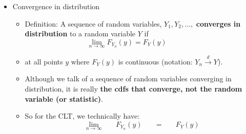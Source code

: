 \documentclass{article}
\begin{document}
\begin{itemize}
\begin{enumerate}
    \end{enumerate}\bigskip
    \item Convergence in distribution
    \begin{itemize}
        \item Definition: A sequence of random variables, $Y_1, Y_2, \dots,$ \textbf{converges in distribution} to a random variable $Y$ if
        \[\lim_{n \to \infty} F_{Y_n}(y) = F_Y(y)\hspace{50pt}\]
        \item[] at all points $y$ where $F_Y(y)$ is continuous (notation: $Y_n \overset{d}{\to} Y$).\bigskip
        \item Although we talk of a sequence of random variables converging in distribution, it is really \textbf{the cdfs that converge, not the random variable (or statistic)}.
        \item[] So for the CLT, we technically have:
        \[\lim_{n \to \infty} \hspace{20pt} F_{Y_n}(y) \hspace{20pt} = \hspace{20pt} F_Y(y)\]
    \end{itemize}\bigskip
\end{itemize}\bigskip
\end{document}
